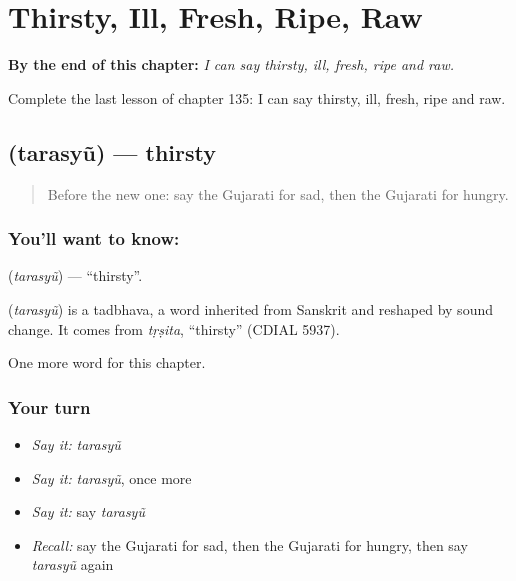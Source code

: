 
\chapter{Thirsty, Ill, Fresh, Ripe, Raw}
\label{ch:gu-thirsty-ill-fresh-ripe-raw}

\begin{chapteropening}
\textbf{By the end of this chapter:} \emph{I can say thirsty, ill, fresh, ripe and raw.}

Complete the last lesson of chapter 135: I can say thirsty, ill, fresh, ripe and raw.
\end{chapteropening}

\section[\texorpdfstring{\gu{તરસ્યું} (tarasyũ)}{તરસ્યું (tarasyũ)}]{ (tarasyũ) — thirsty}

\label{lesson:GU-C135-tarasyu}



\begin{quote}
Before the new one: say the Gujarati for sad, then the Gujarati for hungry.
\end{quote}

\subsection*{You'll want to know: }
\textbf{} (\emph{tarasyũ}) — \textquotedblleft{}thirsty\textquotedblright{}.

\begin{cousinweb}
\textbf{} (\emph{tarasyũ}) is a tadbhava, a word inherited from Sanskrit and reshaped by sound change. It comes from \emph{tṛṣita}, \textquotedblleft{}thirsty\textquotedblright{} (CDIAL 5937).
\end{cousinweb}

\begin{grammarlens}[title={What you've built}]
One more word for this chapter.
\end{grammarlens}

\subsection*{Your turn}
\begin{itemize}
\raggedright
  \item \emph{Say it:} \emph{tarasyũ}
  \item \emph{Say it:} \emph{tarasyũ}, once more
  \item \emph{Say it:} say \emph{tarasyũ}
  \item \emph{Recall:} say the Gujarati for sad, then the Gujarati for hungry, then say \emph{tarasyũ} again
\end{itemize}

